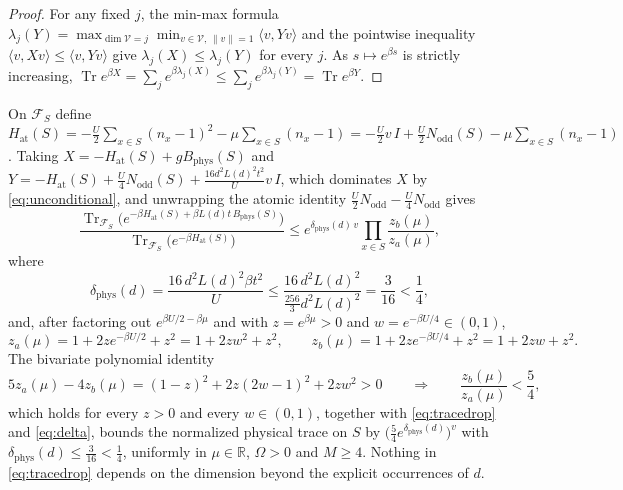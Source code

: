 \documentclass[11pt]{article}
\theoremstyle{plain}
\theoremstyle{definition}
\DeclareMathOperator{\Tr}{Tr}
\newcommand{\Nodd}{N_{\mathrm{odd}}}
\begin{document}
\begin{proof}
For any fixed $j$, the min-max formula
$\lambda_j(Y)=\max_{\dim\mathcal V=j}\min_{v\in\mathcal V,\,\|v\|=1}\langle v,Yv\rangle$
and the pointwise inequality $\langle v,Xv\rangle\le\langle v,Yv\rangle$ give
$\lambda_j(X)\le\lambda_j(Y)$ for every $j$. As $s\mapsto e^{\beta s}$ is
strictly increasing,
$\Tr e^{\beta X}=\sum_je^{\beta\lambda_j(X)}\le\sum_je^{\beta\lambda_j(Y)}=\Tr e^{\beta Y}$.
\end{proof}

On $\mathcal F_S$ define
$H_{\mathrm{at}}(S)=-\frac U2\sum_{x\in S}(n_x-1)^2-\mu\sum_{x\in S}(n_x-1)
 =-\frac U2v\,I+\frac U2\Nodd(S)-\mu\sum_{x\in S}(n_x-1)$.
Taking $X=-H_{\mathrm{at}}(S)+gB_{\mathrm{phys}}(S)$ and
$Y=-H_{\mathrm{at}}(S)+\frac U4\Nodd(S)+\frac{16d^2L(d)^2t^2}{U}v\,I$, which dominates
$X$ by \eqref{eq:unconditional}, and unwrapping the atomic identity
$\frac U2\Nodd-\frac U4\Nodd$ gives
\begin{equation}\label{eq:tracedrop}
 \frac{\Tr_{\mathcal F_S}\bigl(e^{-\beta H_{\mathrm{at}}(S)+\beta L(d)t\,B_{\mathrm{phys}}(S)}\bigr)}
      {\Tr_{\mathcal F_S}\bigl(e^{-\beta H_{\mathrm{at}}(S)}\bigr)}
 \le e^{\delta_{\mathrm{phys}}(d)\,v}\prod_{x\in S}\frac{z_b(\mu)}{z_a(\mu)},
\end{equation}
where
\begin{equation}\label{eq:delta}
 \delta_{\mathrm{phys}}(d)=\frac{16\,d^2L(d)^2\beta t^2}{U}
 \le\frac{16\,d^2L(d)^2}{\frac{256}{3}d^2L(d)^2}=\frac{3}{16}<\frac14 ,
\end{equation}
and, after factoring out $e^{\beta U/2-\beta\mu}$ and with $z=e^{\beta\mu}>0$ and
$w=e^{-\beta U/4}\in(0,1)$,
\begin{equation}\label{eq:zazb}
 z_a(\mu)=1+2ze^{-\beta U/2}+z^2=1+2zw^2+z^2,\qquad
 z_b(\mu)=1+2ze^{-\beta U/4}+z^2=1+2zw+z^2 .
\end{equation}
The bivariate polynomial identity
\begin{equation}\label{eq:fivezb}
 5z_a(\mu)-4z_b(\mu)=(1-z)^2+2z(2w-1)^2+2zw^2>0
 \qquad\Longrightarrow\qquad\frac{z_b(\mu)}{z_a(\mu)}<\frac54 ,
\end{equation}
which holds for every $z>0$ and every $w\in(0,1)$, together with
\eqref{eq:tracedrop} and \eqref{eq:delta}, bounds the normalized physical trace on
$S$ by $\bigl(\frac54e^{\delta_{\mathrm{phys}}(d)}\bigr)^v$ with
$\delta_{\mathrm{phys}}(d)\le\frac{3}{16}<\frac14$, uniformly in $\mu\in\mathbb R$,
$\Omega>0$ and $M\ge4$. Nothing in \eqref{eq:tracedrop} depends on the dimension
beyond the explicit occurrences of $d$.
\end{document}
